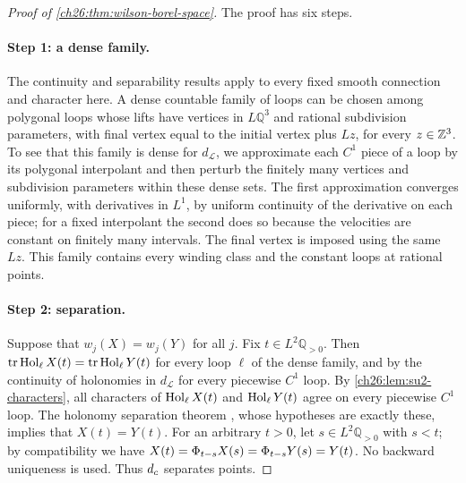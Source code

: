 \begin{proof}[Proof of \cref{ch26:thm:wilson-borel-space}]
The proof has six steps.

\paragraph{Step 1: a dense family.}
The continuity and separability results \cite[Lemmas 3.24--3.25 and 3.28, p.~28]{CCState2023v4} apply to every fixed smooth connection and character here. A dense countable family of loops can be chosen among polygonal loops whose lifts have vertices in $L\mathbb Q^3$ and rational subdivision parameters, with final vertex equal to the initial vertex plus $Lz$, for every $z\in\mathbb Z^3$. To see that this family is dense for $d_{\mathcal L}$, we approximate each $C^1$ piece of a loop by its polygonal interpolant and then perturb the finitely many vertices and subdivision parameters within these dense sets. The first approximation converges uniformly, with derivatives in $L^1$, by uniform continuity of the derivative on each piece; for a fixed interpolant the second does so because the velocities are constant on finitely many intervals. The final vertex is imposed using the same $Lz$. This family contains every winding class and the constant loops at rational points.

\paragraph{Step 2: separation.}
Suppose that $w_j(X)=w_j(Y)$ for all $j$. Fix $t\in L^2\mathbb Q_{>0}$. Then $\operatorname{tr}\operatorname{Hol}_\ell X(t)=\operatorname{tr}\operatorname{Hol}_\ell Y(t)$ for every loop $\ell$ of the dense family, and by the continuity of holonomies in $d_{\mathcal L}$ \cite[Lemmas 3.24--3.25]{CCState2023v4} for every piecewise $C^1$ loop. By \cref{ch26:lem:su2-characters}, all characters of $\operatorname{Hol}_\ell X(t)$ and $\operatorname{Hol}_\ell Y(t)$ agree on every piecewise $C^1$ loop. The holonomy separation theorem \cite[Lemma 1.2, p.~4]{CCState2023v4}, whose hypotheses are exactly these, implies that $X(t)=Y(t)$. For an arbitrary $t>0$, let $s\in L^2\mathbb Q_{>0}$ with $s<t$; by compatibility we have $X(t)=\Phi_{t-s}X(s)=\Phi_{t-s}Y(s)=Y(t)$. No backward uniqueness is used. Thus $d_c$ separates points.


\end{proof}
